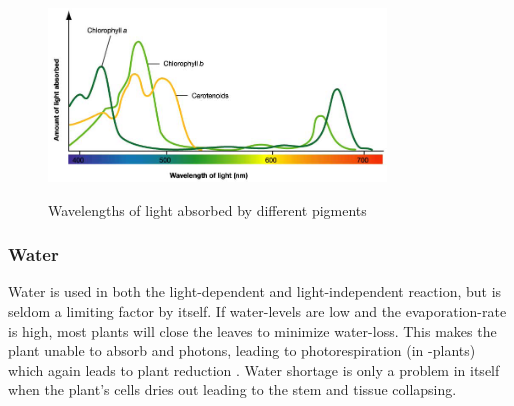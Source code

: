 \begin{figure}
        \centering
        \includegraphics[width=0.8\textwidth]{img/photosynthesis/absorption-spectrum.png}
        \caption{Wavelengths of light absorbed by different pigments}
        \citep{uicbiology}
        \label{fig:wavelengthabsorbtion}
\end{figure}

\subsubsection{Water}
Water is used in both the light-dependent and light-independent reaction, but is seldom a limiting factor by itself. If water-levels are low and the evaporation-rate is high, most plants will close the leaves to minimize water-loss. This makes the plant unable to absorb  and photons, leading to photorespiration (in -plants) which again leads to plant reduction \citep{bi2}. Water shortage is only a problem in itself when the plant’s cells dries out leading to the stem and tissue collapsing. 
